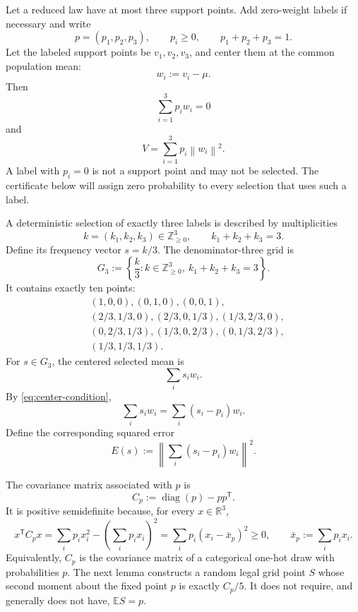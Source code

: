 \documentclass[11pt]{article}
\theoremstyle{definition}
\theoremstyle{remark}
\newcommand{\R}{\mathbb{R}}
\newcommand{\E}{\mathbb{E}}
\newcommand{\diag}{\operatorname{diag}}
\newcommand{\norm}[1]{\left\lVert #1\right\rVert}
\begin{document}
Let a reduced law have at most three support points.  Add zero-weight labels if necessary and write
\[
p=(p_1,p_2,p_3),\qquad p_i\ge0,\qquad p_1+p_2+p_3=1.
\]
Let the labeled support points be $v_1,v_2,v_3$, and center them at the common population mean:
\[
w_i:=v_i-\mu.
\]
Then
\begin{equation}
\sum_{i=1}^3p_iw_i=0
\label{eq:center-condition}
\end{equation}
and
\begin{equation}
V=\sum_{i=1}^3p_i\norm{w_i}^2.
\label{eq:three-point-V}
\end{equation}
A label with $p_i=0$ is not a support point and may not be selected.  The certificate below will assign zero probability to every selection that uses such a label.

A deterministic selection of exactly three labels is described by multiplicities
\[
k=(k_1,k_2,k_3)\in\mathbb Z_{\ge0}^3,
\qquad k_1+k_2+k_3=3.
\]
Define its frequency vector $s=k/3$.  The denominator-three grid is
\begin{equation}
G_3:=\left\{\frac{k}{3}:k\in\mathbb Z_{\ge0}^3,
\ k_1+k_2+k_3=3\right\}.
\label{eq:G3}
\end{equation}
It contains exactly ten points:
\begin{align*}
&(1,0,0),(0,1,0),(0,0,1),\\
&(2/3,1/3,0),(2/3,0,1/3),(1/3,2/3,0),\\
&(0,2/3,1/3),(1/3,0,2/3),(0,1/3,2/3),\\
&(1/3,1/3,1/3).
\end{align*}
For $s\in G_3$, the centered selected mean is
\[
\sum_i s_iw_i.
\]
By \eqref{eq:center-condition},
\begin{equation}
\sum_i s_iw_i
=\sum_i(s_i-p_i)w_i.
\label{eq:s-minus-p}
\end{equation}
Define the corresponding squared error
\begin{equation}
E(s):=\norm{\sum_i(s_i-p_i)w_i}^2.
\label{eq:E-s}
\end{equation}

The covariance matrix associated with $p$ is
\begin{equation}
C_p:=\diag(p)-pp^{\mathsf T}.
\label{eq:Cp}
\end{equation}
It is positive semidefinite because, for every $x\in\R^3$,
\[
x^{\mathsf T}C_px
=\sum_i p_i x_i^2-\left(\sum_i p_i x_i\right)^2
=\sum_i p_i(x_i-\bar x_p)^2\ge0,
\qquad \bar x_p:=\sum_i p_i x_i.
\]
Equivalently, $C_p$ is the covariance matrix of a categorical one-hot draw with probabilities $p$.  The next lemma constructs a random legal grid point $S$ whose second moment about the fixed point $p$ is exactly $C_p/5$.  It does not require, and generally does not have, $\E S=p$.
\end{document}
